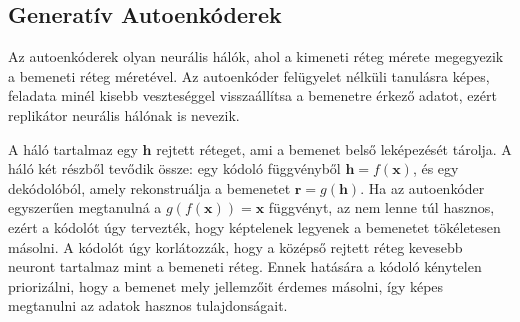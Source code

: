 \subsection{Generatív Autoenkóderek}

Az autoenkóderek olyan neurális hálók, ahol a kimeneti réteg mérete megegyezik a bemeneti réteg méretével. Az autoenkóder felügyelet nélküli tanulásra képes, feladata minél kisebb veszteséggel visszaállítsa a bemenetre érkező adatot, ezért replikátor neurális hálónak is nevezik.




A háló tartalmaz egy $\textbf{h}$ rejtett réteget, ami a bemenet belső leképezését tárolja. A háló két részből tevődik össze: egy kódoló függvényből $\textbf{h} = f(\textbf{x})$, és egy dekódolóból, amely rekonstruálja a bemenetet $\textbf{r} = g(\textbf{h})$. Ha az autoenkóder egyszerűen megtanulná a $g(f(\textbf{x})) = \textbf{x}$ függvényt, az nem lenne túl hasznos, ezért a kódolót úgy tervezték, hogy képtelenek legyenek a bemenetet tökéletesen másolni. A kódolót úgy korlátozzák, hogy a középső rejtett réteg kevesebb neuront tartalmaz mint a bemeneti réteg. Ennek hatására a kódoló kénytelen priorizálni, hogy a bemenet mely jellemzőit érdemes másolni, így képes megtanulni az adatok hasznos tulajdonságait.

